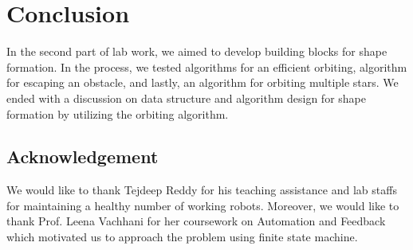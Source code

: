 \documentclass{report}[12pt]
\begin{document}
\chapter{Conclusion}
In the second part of lab work, we aimed to develop building blocks for shape formation. In the process, we tested algorithms for an efficient orbiting, algorithm for escaping an obstacle, and lastly, an algorithm for orbiting multiple stars. We ended with a discussion on data structure and algorithm design for shape formation by utilizing the orbiting algorithm.
\section{Acknowledgement}
We would like to thank Tejdeep Reddy for his teaching assistance and lab staffs for maintaining a healthy number of working robots. Moreover, we would like to thank Prof. Leena Vachhani for her coursework on Automation and Feedback which motivated us to approach the problem using finite state machine.
{}

\end{document}
